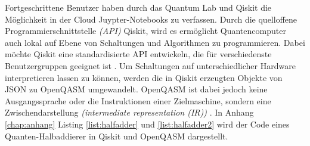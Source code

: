 Fortgeschrittene Benutzer haben durch das Quantum Lab und Qiskit die M\"oglichkeit in der Cloud Juypter-Notebooks zu verfassen. Durch die quelloffene Programmierschnittstelle \textit{(API)} Qiskit, wird es erm\"oglicht Quantencomputer auch lokal auf Ebene von Schaltungen und Algorithmen zu programmieren. Dabei m\"ochte Qiskit eine standardisierte API entwickeln, die f\"ur verschiedenste Benutzergruppen geeignet ist \cite{Qiskit_backend_2018}. Um Schaltungen auf unterschiedlicher Hardware interpretieren lassen zu k\"onnen, werden die in Qiskit erzeugten Objekte von JSON zu OpenQASM umgewandelt. OpenQASM ist dabei jedoch keine Ausgangssprache oder die Instruktionen einer Zielmaschine, sondern eine Zwischendarstellung \textit{(intermediate representation (IR))} \cite{Openqasm_2017}. In Anhang \ref{chap:anhang} Listing \ref{list:halfadder} und \ref{list:halfadder2} wird der Code eines Quanten-Halbaddierer in Qiskit und OpenQASM dargestellt.

